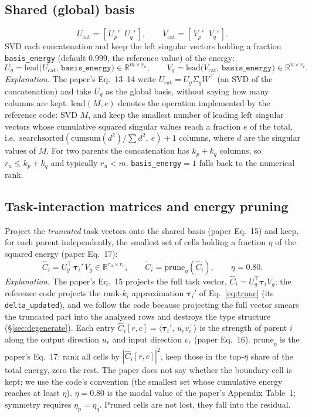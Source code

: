 \documentclass[11pt,a4paper]{article}
\newcommand{\tauv}{\boldsymbol{\tau}}
\newcommand{\Ug}{U_g}
\newcommand{\Vg}{V_g}
\newcommand{\Ct}{\tilde{C}}
\newcommand{\code}[1]{\texttt{#1}}
\begin{document}
\subsection{Shared (global) basis}
\begin{equation}
U_{\mathrm{cat}} = [\,U_p'\;\;U_q'\,], \qquad V_{\mathrm{cat}} = [\,V_p'\;\;V_q'\,].
\end{equation}
SVD each concatenation and keep the left singular vectors holding a fraction \code{basis\_energy} (default 0.999, the reference value) of the energy:
\begin{equation}
\Ug = \mathrm{lead}\bigl(U_{\mathrm{cat}},\,\code{basis\_energy}\bigr)\in\mathbb{R}^{m\times r_u},\qquad
\Vg = \mathrm{lead}\bigl(V_{\mathrm{cat}},\,\code{basis\_energy}\bigr)\in\mathbb{R}^{n\times r_v}.
\label{eq:basis}
\end{equation}
\emph{Explanation.} The paper's Eq.~13--14 write $U_{\mathrm{cat}}=U_g\Sigma_g W^{\top}$ (an SVD of the concatenation) and take $U_g$ as the global basis, without saying how many columns are kept. $\mathrm{lead}(M,e)$ denotes the operation implemented by the reference code: SVD $M$, and keep the smallest number of leading left singular vectors whose cumulative squared singular values reach a fraction $e$ of the total, i.e.\ $\mathrm{searchsorted}(\mathrm{cumsum}(d^2)/\sum d^2,\ e)+1$ columns, where $d$ are the singular values of $M$. For two parents the concatenation has $k_p+k_q$ columns, so $r_u\le k_p+k_q$ and typically $r_u<m$. \code{basis\_energy}$=1$ falls back to the numerical rank.

\subsection{Task-interaction matrices and energy pruning}
Project the \emph{truncated} task vectors onto the shared basis (paper Eq.~15) and keep, for each parent independently, the smallest set of cells holding a fraction $\eta$ of the squared energy (paper Eq.~17):
\begin{equation}
\hat C_i = \Ug^{\top}\,\tauv_i'\,\Vg\in\mathbb{R}^{r_u\times r_v},\qquad
\Ct_i = \mathrm{prune}_\eta(\hat C_i),\qquad \eta=0.80 .
\label{eq:prune}
\end{equation}
\emph{Explanation.} The paper's Eq.~15 projects the full task vector, $\hat C_i=\Ug^{\top}\tauv_i\Vg$; the reference code projects the rank-$k_i$ approximation $\tauv_i'$ of Eq.~\ref{eq:trunc} (its \code{delta\_updated}), and we follow the code because projecting the full vector smears the truncated part into the analysed rows and destroys the type structure (\S\ref{sec:degenerate}). Each entry $\hat C_i[r,c]=\langle\tauv_i',\,u_r v_c^{\top}\rangle$ is the strength of parent $i$ along the output direction $u_r$ and input direction $v_c$ (paper Eq.~16). $\mathrm{prune}_\eta$ is the paper's Eq.~17: rank all cells by $|\hat C_i[r,c]|^2$, keep those in the top-$\eta$ share of the total energy, zero the rest. The paper does not say whether the boundary cell is kept; we use the code's convention (the smallest set whose cumulative energy reaches at least $\eta$). $\eta=0.80$ is the modal value of the paper's Appendix Table~1; symmetry requires $\eta_p=\eta_q$. Pruned cells are not lost, they fall into the residual.
\end{document}
